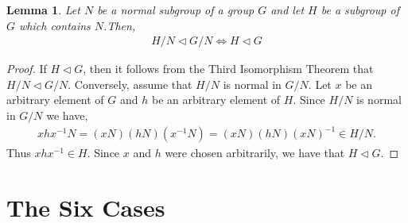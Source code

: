 \documentclass[a4paper , 11pt]{book}
\newtheorem{lemma}[theorem]{Lemma}
\theoremstyle{definition}
\theoremstyle{remark}
\begin{document}
\begin{lemma}\label{normalquotient} Let $N$ be a normal subgroup of a group $G$ and let $H$ be a subgroup of $G$ which contains $N$.Then,
\begin{align*} H / N \vartriangleleft G / N \iff H \vartriangleleft G
\end{align*} 
\end{lemma}

\begin{proof} If $H \vartriangleleft G$, then it follows from the Third Isomorphism Theorem that $ H / N \vartriangleleft G / N$. Conversely, assume that $H / N$ is normal in $G / N$. Let $x$ be an arbitrary element of $G$ and $h$ be an arbitrary element of $H$. Since $H / N$ is normal in $G / N$ we have,
\begin{align*} x h x^{-1}N = (xN)(hN)(x^{-1}N) = (xN)(hN)(xN)^{-1} \in H / N.
\end{align*}
Thus $x h x^{-1} \in H$. Since $x$ and $h$ were chosen arbitrarily, we have that $H \vartriangleleft G$.

\end{proof}

\section {The Six Cases}
\end{document}
